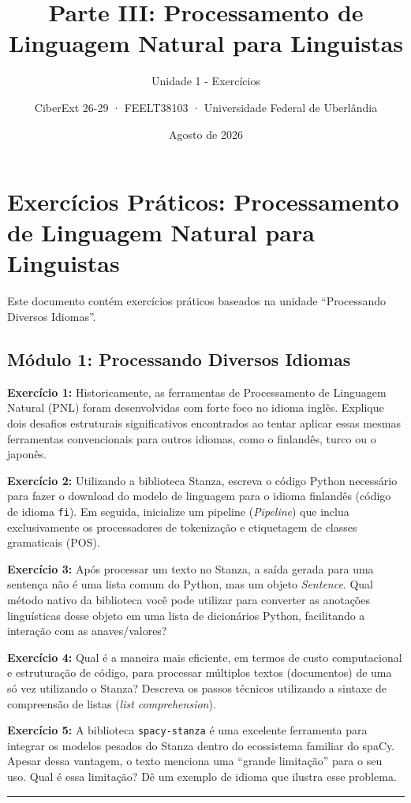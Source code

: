 \documentclass[
  brazilian,
]{article}
\title{Parte III: Processamento de Linguagem Natural para Linguistas}
\subtitle{Unidade 1 - Exercícios}
\author{CiberExt 26-29 · FEELT38103 · Universidade Federal de
Uberlândia}
\date{Agosto de 2026}
\begin{document}
\maketitle

\hypertarget{exercuxedcios-pruxe1ticos-processamento-de-linguagem-natural-para-linguistas}{%
\section{Exercícios Práticos: Processamento de Linguagem Natural para
Linguistas}\label{exercuxedcios-pruxe1ticos-processamento-de-linguagem-natural-para-linguistas}}

Este documento contém exercícios práticos baseados na unidade
``Processando Diversos Idiomas''.

\hypertarget{muxf3dulo-1-processando-diversos-idiomas}{%
\subsection{Módulo 1: Processando Diversos
Idiomas}\label{muxf3dulo-1-processando-diversos-idiomas}}

\textbf{Exercício 1:} Historicamente, as ferramentas de Processamento de
Linguagem Natural (PNL) foram desenvolvidas com forte foco no idioma
inglês. Explique dois desafios estruturais significativos encontrados ao
tentar aplicar essas mesmas ferramentas convencionais para outros
idiomas, como o finlandês, turco ou o japonês.

\textbf{Exercício 2:} Utilizando a biblioteca Stanza, escreva o código
Python necessário para fazer o download do modelo de linguagem para o
idioma finlandês (código de idioma
\texttt{\textquotesingle{}fi\textquotesingle{}}). Em seguida, inicialize
um pipeline (\emph{Pipeline}) que inclua exclusivamente os processadores
de tokenização e etiquetagem de classes gramaticais (POS).

\textbf{Exercício 3:} Após processar um texto no Stanza, a saída gerada
para uma sentença não é uma lista comum do Python, mas um objeto
\emph{Sentence}. Qual método nativo da biblioteca você pode utilizar
para converter as anotações linguísticas desse objeto em uma lista de
dicionários Python, facilitando a interação com as anaves/valores?

\textbf{Exercício 4:} Qual é a maneira mais eficiente, em termos de
custo computacional e estruturação de código, para processar múltiplos
textos (documentos) de uma só vez utilizando o Stanza? Descreva os
passos técnicos utilizando a sintaxe de compreensão de listas
(\emph{list comprehension}).

\textbf{Exercício 5:} A biblioteca \texttt{spacy-stanza} é uma excelente
ferramenta para integrar os modelos pesados do Stanza dentro do
ecossistema familiar do spaCy. Apesar dessa vantagem, o texto menciona
uma ``grande limitação'' para o seu uso. Qual é essa limitação? Dê um
exemplo de idioma que ilustra esse problema.

\begin{center}\rule{0.5\linewidth}{0.5pt}\end{center}
\end{document}
